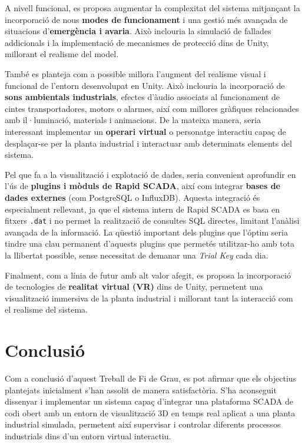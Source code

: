 \documentclass[a4paper,11pt,DIV=13,headings=normal,abstract=true,twoside=semi]{article}
\begin{document}
A nivell funcional, es proposa augmentar la complexitat del sistema mitjançant la incorporació de nous \textbf{modes de funcionament} i una gestió més avançada de situacions d'\textbf{emergència i avaria}. Això inclouria la simulació de fallades addicionals i la implementació de mecanismes de protecció dins de Unity, millorant el realisme del model.

També es planteja com a possible millora l'augment del realisme visual i funcional de l'entorn desenvolupat en Unity. Això inclouria la incorporació de \textbf{sons ambientals industrials}, efectes d'àudio associats al funcionament de cintes transportadores, motors o alarmes, així com millores gràfiques relacionades amb il·luminació, materials i animacions. De la mateixa manera, seria interessant implementar un \textbf{operari virtual} o personatge interactiu capaç de desplaçar-se per la planta industrial i interactuar amb determinats elements del sistema.

Pel que fa a la visualització i explotació de dades, seria convenient aprofundir en l'ús de \textbf{plugins i mòduls de Rapid SCADA}, així com integrar \textbf{bases de dades externes} (com PostgreSQL o InfluxDB). Aquesta integració és especialment rellevant, ja que el sistema intern de Rapid SCADA es basa en fitxers \texttt{.dat} i no permet la realització de consultes SQL directes, limitant l'anàlisi avançada de la informació. La qüestió important dels plugins que l'óptim seria tindre una clau permanent d'aquests plugins que permetés utilitzar-ho amb tota la llibertat possible, sense necessitat de demanar una \textit{Trial Key} cada dia.

Finalment, com a línia de futur amb alt valor afegit, es proposa la incorporació de tecnologies de \textbf{realitat virtual (VR)} dins de Unity, permetent una visualització immersiva de la planta industrial i millorant tant la interacció com el realisme del sistema.
\newpage

\section{Conclusió}

Com a conclusió d'aquest Treball de Fi de Grau, es pot afirmar que els objectius plantejats inicialment s'han assolit de manera satisfactòria. S'ha aconseguit dissenyar i implementar un sistema capaç d'integrar una plataforma SCADA de codi obert amb un entorn de visualització 3D en temps real aplicat a una planta industrial simulada, permetent així supervisar i controlar diferents processos industrials dins d'un entorn virtual interactiu.
\end{document}
